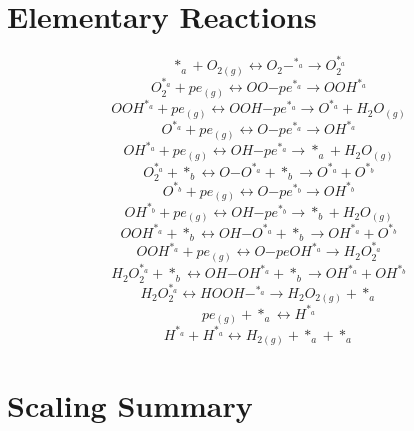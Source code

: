 \documentclass[a4paper,8pt]{report}
\begin{document}
\section{Elementary Reactions}
\begin{equation}
\label{reaction_0}
*_a+O_{2(g)} \leftrightarrow O_{2}\mathrm{-}^{*_a} \rightarrow O_{2}^{*_a}
\end{equation}
\begin{equation}
\label{reaction_1}
O_{2}^{*_a}+pe_{(g)} \leftrightarrow OO\mathrm{-}pe^{*_a} \rightarrow OOH^{*_a}
\end{equation}
\begin{equation}
\label{reaction_2}
OOH^{*_a}+pe_{(g)} \leftrightarrow OOH\mathrm{-}pe^{*_a} \rightarrow O^{*_a}+H_{2}O_{(g)}
\end{equation}
\begin{equation}
\label{reaction_3}
O^{*_a}+pe_{(g)} \leftrightarrow O\mathrm{-}pe^{*_a} \rightarrow OH^{*_a}
\end{equation}
\begin{equation}
\label{reaction_4}
OH^{*_a}+pe_{(g)} \leftrightarrow OH\mathrm{-}pe^{*_a} \rightarrow *_a+H_{2}O_{(g)}
\end{equation}
\begin{equation}
\label{reaction_5}
O_{2}^{*_a}+*_b \leftrightarrow O\mathrm{-}O^{*_a}+*_b \rightarrow O^{*_a}+O^{*_b}
\end{equation}
\begin{equation}
\label{reaction_6}
O^{*_b}+pe_{(g)} \leftrightarrow O\mathrm{-}pe^{*_b} \rightarrow OH^{*_b}
\end{equation}
\begin{equation}
\label{reaction_7}
OH^{*_b}+pe_{(g)} \leftrightarrow OH\mathrm{-}pe^{*_b} \rightarrow *_b+H_{2}O_{(g)}
\end{equation}
\begin{equation}
\label{reaction_8}
OOH^{*_a}+*_b \leftrightarrow OH\mathrm{-}O^{*_a}+*_b \rightarrow OH^{*_a}+O^{*_b}
\end{equation}
\begin{equation}
\label{reaction_9}
OOH^{*_a}+pe_{(g)} \leftrightarrow O\mathrm{-}peOH^{*_a} \rightarrow H_{2}O_{2}^{*_a}
\end{equation}
\begin{equation}
\label{reaction_10}
H_{2}O_{2}^{*_a}+*_b \leftrightarrow OH\mathrm{-}OH^{*_a}+*_b \rightarrow OH^{*_a}+OH^{*_b}
\end{equation}
\begin{equation}
\label{reaction_11}
H_{2}O_{2}^{*_a} \leftrightarrow HOOH\mathrm{-}^{*_a} \rightarrow H_{2}O_{2(g)}+*_a
\end{equation}
\begin{equation}
\label{reaction_12}
pe_{(g)}+*_a \leftrightarrow H^{*_a}
\end{equation}
\begin{equation}
\label{reaction_13}
H^{*_a}+H^{*_a} \leftrightarrow H_{2(g)}+*_a+*_a
\end{equation}\section{Scaling Summary}
\end{document}
